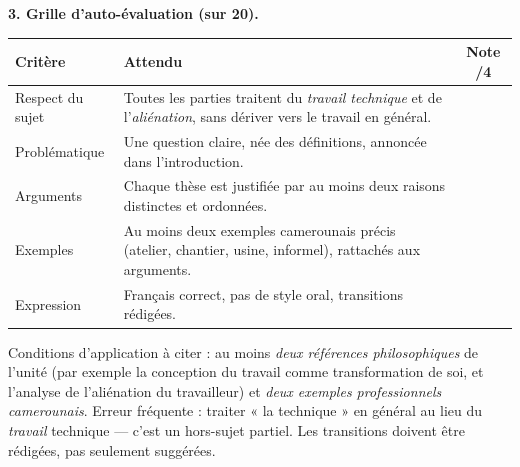 \documentclass[11pt]{article}
\begin{document}
\begin{corrige}
\textbf{3. Grille d'auto-évaluation (sur 20).}
\begin{center}
\begin{tabularx}{\linewidth}{|l|X|c|}
\hline
\rowcolor{popblueL} \textbf{Critère} & \textbf{Attendu} & \textbf{Note /4} \\
\hline
Respect du sujet & Toutes les parties traitent du \emph{travail technique} et de l'\emph{aliénation}, sans dériver vers le travail en général. & \\
\hline
Problématique & Une question claire, née des définitions, annoncée dans l'introduction. & \\
\hline
Arguments & Chaque thèse est justifiée par au moins deux raisons distinctes et ordonnées. & \\
\hline
Exemples & Au moins deux exemples camerounais précis (atelier, chantier, usine, informel), rattachés aux arguments. & \\
\hline
Expression & Français correct, pas de style oral, transitions rédigées. & \\
\hline
\end{tabularx}
\end{center}
\begin{attention}
Conditions d'application à citer : au moins \emph{deux références philosophiques} de l'unité (par exemple la conception du travail comme transformation de soi, et l'analyse de l'aliénation du travailleur) et \emph{deux exemples professionnels camerounais}. Erreur fréquente : traiter « la technique » en général au lieu du \emph{travail} technique — c'est un hors-sujet partiel. Les transitions doivent être rédigées, pas seulement suggérées.
\end{attention}
\end{corrige}
\end{document}
